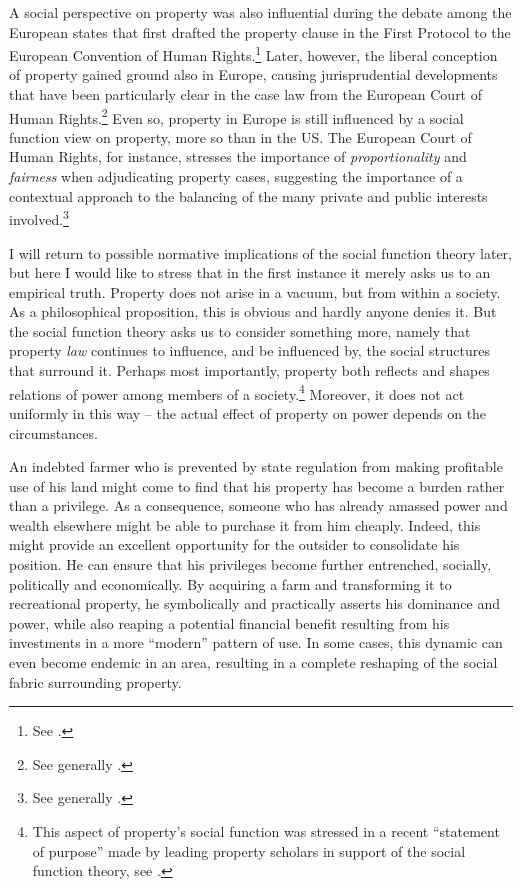 A social perspective on property was also influential during the debate among the European states that first drafted the property clause in the First Protocol to the European Convention of Human Rights.\footnote{See \cite[1063-1065]{allen10}.} Later, however, the liberal conception of property gained ground also in Europe, causing jurisprudential developments that have been particularly clear in the case law from the European Court of Human Rights.\footnote{See generally \cite{allen10}.} Even so, property  in Europe is still influenced by a social function view on property, more so than in the US. The European Court of Human Rights, for instance, stresses the importance of {\it proportionality} and {\it fairness} when adjudicating property cases, suggesting the importance of a contextual approach to the balancing of the many private and public interests involved.\footnote{See generally \cite[Chapter 5]{allen05}.}

I will return to possible normative implications of the social function theory later, but here I would like to stress that in the first instance it merely asks us to  an empirical truth. Property does not arise in a vacuum, but from within a society. As a philosophical proposition, this is obvious and hardly anyone denies it. But the social function theory asks us to consider something more, namely that property {\it law} continues to influence, and be influenced by, the social structures that surround it. Perhaps most importantly, property both reflects and shapes relations of power among members of a society.\footnote{This aspect of property's social function was stressed in a recent ``statement of purpose'' made by leading property scholars in support of the social function theory, see \cite{alexander09a}.} Moreover, it does not act uniformly in this way -- the actual effect of property on power depends on the circumstances.

An indebted farmer who is prevented by state regulation from making profitable use of his land might come to find that his property has become a burden rather than a privilege. As a consequence, someone who has already amassed power and wealth elsewhere might be able to purchase it from him cheaply. Indeed, this might provide an excellent opportunity for the outsider to consolidate his position. He can ensure that his privileges become further entrenched, socially, politically and economically. By acquiring a farm and transforming it to recreational property, he symbolically and practically asserts his dominance and power, while also reaping a potential financial benefit resulting from his investments in a more ``modern'' pattern of use. In some cases, this dynamic can even become endemic in an area, resulting in a complete reshaping of the social fabric surrounding property.

